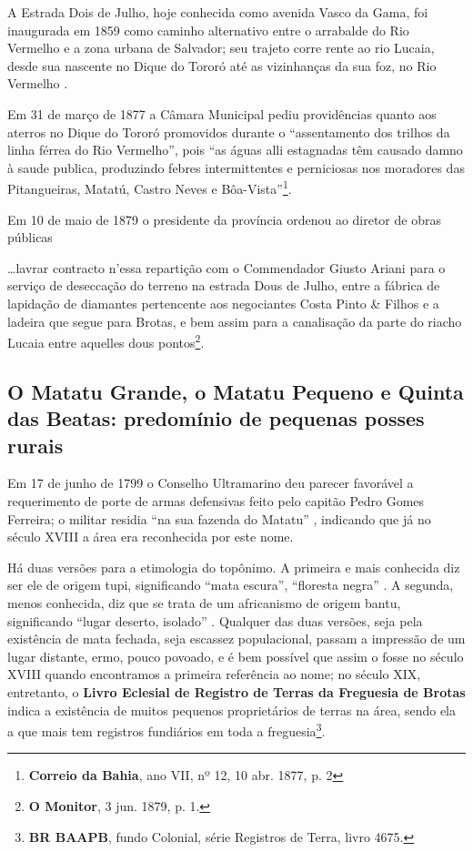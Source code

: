 A Estrada Dois de Julho, hoje conhecida como avenida Vasco da Gama, foi inaugurada em 1859 como caminho alternativo entre o arrabalde do Rio Vermelho e a zona urbana de Salvador; seu trajeto corre rente ao rio Lucaia, desde sua nascente no Dique do Tororó até as vizinhanças da sua foz, no Rio Vermelho \cite[p.~582]{ruy_politica_1949}.

Em 31 de março de 1877 a Câmara Municipal pediu providências quanto aos aterros no Dique do Tororó promovidos durante o ``assentamento dos trilhos da linha férrea do Rio Vermelho'', pois ``as águas alli estagnadas têm causado damno à saude publica, produzindo febres intermittentes e perniciosas nos moradores das Pitangueiras, Matatú, Castro Neves e Bôa-Vista''\footnote{\textbf{Correio da Bahia}, ano VII, nº 12, 10 abr. 1877, p. 2}.

Em 10 de maio de 1879 o presidente da província ordenou ao diretor de obras públicas 

\begin{citacao}
\dots lavrar contracto n'essa repartição com o Commendador Giusto Ariani para o serviço de deseccação do terreno na estrada Dous de Julho, entre a fábrica de lapidação de diamantes pertencente aos negociantes Costa Pinto \& Filhos e a ladeira que segue para Brotas, e bem assim para a canalisação da parte do riacho Lucaia entre aquelles dous pontos\footnote{\textbf{O Monitor}, 3 jun. 1879, p. 1.}.
\end{citacao}



\subsection{O Matatu Grande, o Matatu Pequeno e Quinta das Beatas: predomínio de pequenas posses rurais}\label{subsec:matatubeatas}

Em 17 de junho de 1799 o Conselho Ultramarino deu parecer favorável a requerimento de porte de armas defensivas feito pelo capitão Pedro Gomes Ferreira; o militar residia ``na sua fazenda do Matatu'' \cite[p.~228]{castralmeida_ultramar_1914}, indicando que já no século XVIII a área era reconhecida por este nome. 

Há duas versões para a etimologia do topônimo. A primeira e mais conhecida diz ser ele de origem tupi, significando ``mata escura'', ``floresta negra'' \cite[p.~281]{sampaio_tupi_1987}. A segunda, menos conhecida, diz que se trata de um africanismo de origem bantu, significando ``lugar deserto, isolado'' \cite[p. 46]{dorea_ruas_2006}. Qualquer das duas versões, seja pela existência de mata fechada, seja escassez populacional, passam a impressão de um lugar distante, ermo, pouco povoado, e é bem possível que assim o fosse no século XVIII quando encontramos a primeira referência ao nome; no século XIX, entretanto, o \textbf{Livro Eclesial de Registro de Terras da Freguesia de Brotas} indica a existência de muitos pequenos proprietários de terras na área, sendo ela a que mais tem registros fundiários em toda a freguesia\footnote{\textbf{BR BAAPB}, fundo Colonial, série Registros de Terra, livro 4675.}.

